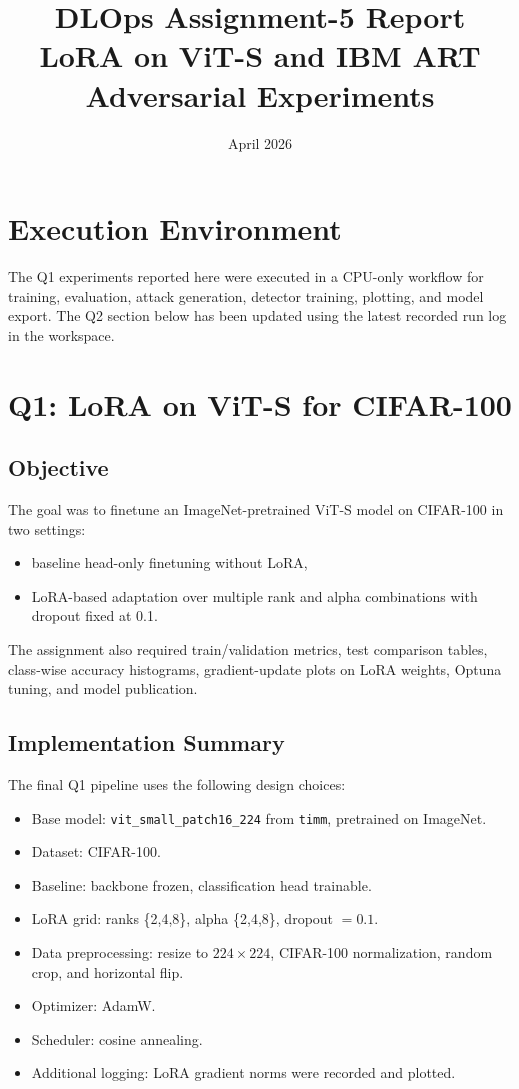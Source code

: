 \documentclass[11pt]{article}
\title{DLOps Assignment-5 Report\\LoRA on ViT-S and IBM ART Adversarial Experiments}
\author{}
\date{April 2026}
\begin{document}
\maketitle

\section{Execution Environment}
The Q1 experiments reported here were executed in a CPU-only workflow for training, evaluation, attack generation, detector training, plotting, and model export. The Q2 section below has been updated using the latest recorded run log in the workspace.

\section{Q1: LoRA on ViT-S for CIFAR-100}
\subsection{Objective}
The goal was to finetune an ImageNet-pretrained ViT-S model on CIFAR-100 in two settings:
\begin{itemize}
    \item baseline head-only finetuning without LoRA,
    \item LoRA-based adaptation over multiple rank and alpha combinations with dropout fixed at 0.1.
\end{itemize}
The assignment also required train/validation metrics, test comparison tables, class-wise accuracy histograms, gradient-update plots on LoRA weights, Optuna tuning, and model publication.

\subsection{Implementation Summary}
The final Q1 pipeline uses the following design choices:
\begin{itemize}
    \item Base model: \texttt{vit\_small\_patch16\_224} from \texttt{timm}, pretrained on ImageNet.
    \item Dataset: CIFAR-100.
    \item Baseline: backbone frozen, classification head trainable.
    \item LoRA grid: ranks \{2,4,8\}, alpha \{2,4,8\}, dropout \(=0.1\).
    \item Data preprocessing: resize to \(224 \times 224\), CIFAR-100 normalization, random crop, and horizontal flip.
    \item Optimizer: AdamW.
    \item Scheduler: cosine annealing.
    \item Additional logging: LoRA gradient norms were recorded and plotted.
\end{itemize}
\end{document}
